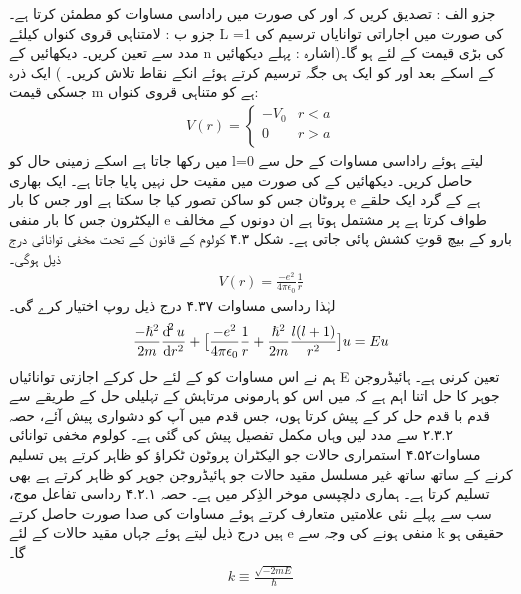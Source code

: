%
جزو الف : تصدیق کریں کہ
اور
کی صورت میں
راداسی مساوات کو مطمئن كرتا ہے۔
جزو ب : لامتناہی قروی کنواں کیلئے L =1 کی صورت میں اجاراتی توانایاں ترسیم کی مدد سے تعین کریں۔ دیکھائیں کے n کی بڑی قیمت کے لئے 
ہو گا۔(اشارہ : پہلے دیکھائیں کے
اسکے بعد
اور
کو ایک ہی جگہ ترسیم کرتے ہوئے انکے نقاط تلاش کریں۔ )
%
 ایک ذرہ جسکی قیمت m ہے کو متناہی قروی کنواں:
\begin{align}
V(r)=\begin{cases}-V_{0}&r<a\\0&r>a\\\end{cases} 
\end{align}
میں رکھا جاتا ہے اسکے زمینی حال کو l=0 لیتے ہوئے راداسی مساوات کے حل سے حاصل کریں۔ دیکھائیں کے
کی صورت میں مقیت حل نہیں پایا جاتا ہے۔
 ایک بھاری پروٹان جس کو ساکن تصور کیا جا سکتا ہے اور جس کا بار e ہے کے  گرد ایک حلقے الیکٹرون جس کا بار منفی e طواف کرتا ہے پر مشتمل ہوتا ہے ان دونوں کے مخالف بارو کے بیچ قوتِ کشش پائی جاتی ہے۔
 شکل ۴.۳
 کولوم کے قانون کے تحت مخفی توانائی درج ذیل ہوگی۔  
 \begin{align}
V(r)=\frac{-e^{2}}{4\pi\epsilon_{0}}\frac{1}{r} 
\end{align}
لہٰذا رداسی مساوات ۴.۳۷ درج ذیل روپ اختیار کرے گی۔
\begin{align}
\frac{-\hslash^{2}}{2m}\frac{\dif^{2}{u}}{\dif{r^{2}}}+\big[\frac{-e^{2}}{4\pi\epsilon_{0}}\frac{1}{r}+\frac{\hslash^{2}}{2m}\frac{l(l+1)}{r^{2}}\big]u=Eu 
\end{align}
 ہم نے اس مساوات کو 
  کے لئے حل کرکے اجازتی توانائیاں E تعین کرنی ہے۔  ہائیڈروجن جوہر کا حل اتنا اہم ہے کہ میں اس کو ہارمونی مرتاہش کے تہلیلی حل کے طریقے سے قدم با قدم حل کر کے پیش کرتا ہوں، جس قدم میں آپ کو دشواری پیش آئے، حصہ ۲.۳.۲ سے مدد لیں وہاں مکمل تفصیل پیش کی گئی ہے۔ کولوم مخفی توانائی مساوات۴.۵۲ 
 استمراری حالات جو الیکٹران پروٹون ٹکراؤ کو ظاہر کرتے ہیں تسلیم کرنے کے ساتھ ساتھ غیر مسلسل مقید حالات جو ہائیڈروجن جوہر کو ظاہر کرتے ہے بھی تسلیم کرتا ہے۔ ہماری دلچپسی موخر الذِکر میں ہے۔
 حصہ ۴.۲.۱
 رداسی تفاعل موج، سب سے پہلے نئی علامتیں متعارف کرتے ہوئے مساوات کی صدا صورت حاصل کرتے ہیں درج ذیل لیتے ہوئے جہاں مقید حالات کے لئے e منفی ہونے کی وجہ سے k  حقیقی ہو گا۔
 \begin{align}
k\equiv \frac{\sqrt{-2mE}}{\hslash} 
\end{align}
